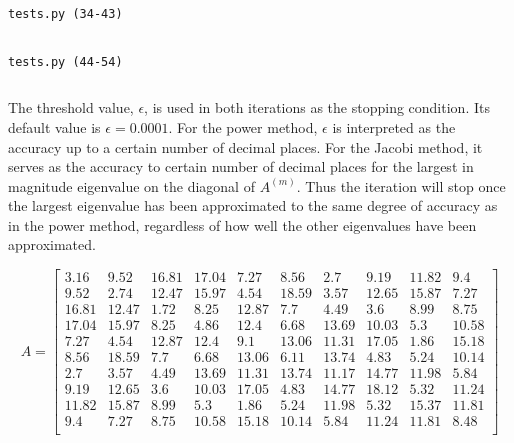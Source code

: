 \documentclass[12pt]{article}
\newcommand{\snippetfromfile}[3]{
  \begin{mdframed}[
      backgroundcolor=black!10,
      linewidth=0pt
  ]
    \begin{center}
      \dotfill\texttt{#1 (#2-#3)}\dotfill
      \inputminted[firstline=#2, lastline=#3, linenos]{python}{#1}
    \end{center}
  \end{mdframed}
}
\begin{document}
\snippetfromfile{tests.py}{34}{43}
\snippetfromfile{tests.py}{44}{54}

The threshold value, $\epsilon$, is used in both iterations as the stopping
condition. Its default value is $\epsilon=0.0001$. For the power method,
$\epsilon$ is interpreted as the accuracy up to a certain number of decimal
places. For the Jacobi method, it serves as the accuracy to certain number of
decimal places for the largest in magnitude eigenvalue on the diagonal of
$A^{(m)}$. Thus the iteration will stop once the largest eigenvalue has been
approximated to the same degree of accuracy as in the power method, regardless
of how well the other eigenvalues have been approximated.

$$ A = 
\begin{bmatrix}
3.16 & 9.52 & 16.81 & 17.04 & 7.27 & 8.56 & 2.7 & 9.19 & 11.82 & 9.4 \\
9.52 & 2.74 & 12.47 & 15.97 & 4.54 & 18.59 & 3.57 & 12.65 & 15.87 & 7.27 \\
16.81 & 12.47 & 1.72 & 8.25 & 12.87 & 7.7 & 4.49 & 3.6 & 8.99 & 8.75 \\
17.04 & 15.97 & 8.25 & 4.86 & 12.4 & 6.68 & 13.69 & 10.03 & 5.3 & 10.58 \\
7.27 & 4.54 & 12.87 & 12.4 & 9.1 & 13.06 & 11.31 & 17.05 & 1.86 & 15.18 \\
8.56 & 18.59 & 7.7 & 6.68 & 13.06 & 6.11 & 13.74 & 4.83 & 5.24 & 10.14 \\
2.7 & 3.57 & 4.49 & 13.69 & 11.31 & 13.74 & 11.17 & 14.77 & 11.98 & 5.84 \\
9.19 & 12.65 & 3.6 & 10.03 & 17.05 & 4.83 & 14.77 & 18.12 & 5.32 & 11.24 \\
11.82 & 15.87 & 8.99 & 5.3 & 1.86 & 5.24 & 11.98 & 5.32 & 15.37 & 11.81 \\
9.4 & 7.27 & 8.75 & 10.58 & 15.18 & 10.14 & 5.84 & 11.24 & 11.81 & 8.48 \\
\end{bmatrix}
$$
\end{document}
